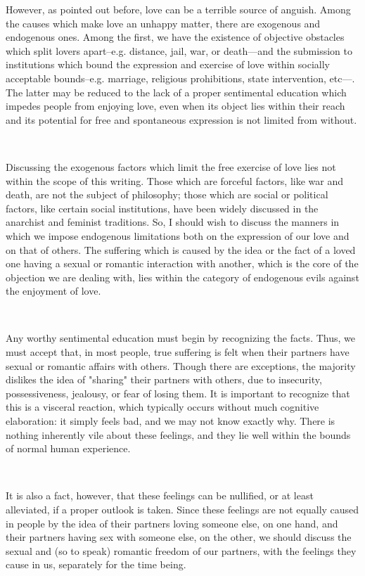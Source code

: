 \documentclass[a4paper, 12pt]{article}
\begin{document}
However, as pointed out before, love can be a terrible source of anguish. Among the
causes which make love an unhappy matter, there are exogenous and
endogenous ones. Among the first, we have the existence of objective
obstacles which split lovers apart--e.g. distance, jail, war, or death---and
the submission to institutions which bound the expression and exercise of love
within socially acceptable bounds--e.g. marriage, religious prohibitions, state
intervention, etc---. The latter may be reduced to the lack of a
proper sentimental education which impedes people from enjoying love, even when its
object lies within their reach and its potential for free and spontaneous
expression is not limited from without. 


~ 

Discussing the exogenous factors which limit the free exercise of love lies not
within the scope of this writing. Those which are forceful factors, like war
and death, are not the subject of philosophy; those which are social or
political factors, like certain social institutions, have been widely discussed
in the anarchist and feminist traditions. So, I should wish to discuss the
manners in which we impose endogenous limitations both on the expression of our
love and on that of others. The suffering which is caused by the idea or the
fact of a loved one having a sexual or romantic interaction with another, which is 
the core of the objection we are dealing with, lies
within the category of endogenous evils against the enjoyment of love.

~

Any worthy sentimental education must begin by recognizing the facts. Thus, we
must accept that, in most people, true suffering is felt when their partners
have sexual or romantic affairs with others. Though there are exceptions, the
majority dislikes the idea of "sharing" their partners with others, due to
insecurity, possessiveness, jealousy, or fear of losing them. It is important
to recognize that this is a visceral reaction, which typically occurs without
much cognitive elaboration: it simply feels bad, and we may not know exactly
why. There is nothing inherently vile about these feelings, and they lie well
within the bounds of normal human experience.

~ 

It is also a fact, however, that these feelings can be nullified, or at least
alleviated, if a proper outlook is taken. Since these feelings are not equally 
caused in people by the idea of their partners loving someone else, on one hand,
and their partners having sex with someone else, on the other, we should discuss 
the sexual and (so to speak) romantic freedom of our partners, with the
feelings they cause in us, separately for the time being.
\end{document}
